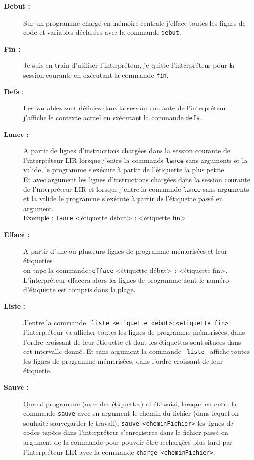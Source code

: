 \begin{description}
	\item[\textbf{Debut :}] Sur un programme chargé en mémoire centrale j'efface toutes les lignes de code et variables déclarées avec la commande \verb|debut|.
	
	\item[\textbf{Fin :}] Je suis en train d'utiliser l'interpréteur, je quitte l'interpréteur pour la session courante en exécutant la commande \verb|fin|.
	
	\item[\textbf{Defs :}] Les variables sont définies dans la session courante de l'interpréteur j'affiche le contexte actuel en exécutant la commande \verb|defs|.
	
	\item[\textbf{Lance :}] A partir de lignes d'instructions chargées dans la session courante de l'interpréteur LIR lorsque j'entre la commande \verb|lance| sans arguments et la valide, le programme s'exécute à partir de l'étiquette la plus petite.\\
	 Et avec argument les lignes d'instructions chargées dans la session courante de l'interpréteur LIR et lorsque j'entre la commande \verb|lance| sans arguments et la valide le programme s'exécute à partir de l'étiquette passé en argument.\\
	
	Exemple : \verb|lance| <étiquette début> : <étiquette fin>
	
	\item[\textbf{Efface :}] A partir d'une ou plusieurs lignes de programme mémorisées et leur étiquettes\\ on tape la commande: \verb|efface| <étiquette début> : <étiquette fin>.\\
	L'interpréteur effacera alors les lignes de programme dont le numéro d'étiquette est compris dans la plage.
	
	\item[\textbf{Liste :}]  J'entre la commande \verb| liste <etiquette_debut>:<etiquette_fin> | l'interpréteur va afficher toutes les lignes de programme mémorisées, dans l'ordre croissant de leur étiquette et dont les étiquettes sont situées dans cet intervalle donné. Et sans argument la commande \verb| liste | affiche toutes les lignes de programme mémorisées, dans l'ordre croissant de leur étiquette.
	
	\item[\textbf{Sauve :}] Quand programme (avec des étiquettes) ai été saisi, lorsque on entre la commande \verb|sauve| avec en argument le chemin du fichier (dans lequel on souhaite sauvegarder le travail),
	\verb|sauve <cheminFichier>| les lignes de codes tapées dans l'interpréteur s'enregistres dans le fichier passé en argument de la commande
	pour pouvoir être rechargées plus tard par l'interpréteur LIR avec la commande \verb|charge <cheminFichier>|.
	

\end{description}

